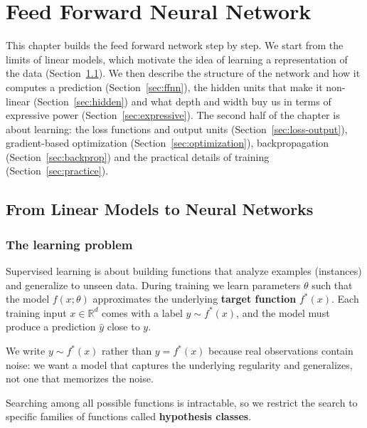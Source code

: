 \chapter{Feed Forward Neural Network}

This chapter builds the feed forward network step by step. We start from the
limits of linear models, which motivate the idea of learning a representation of
the data (Section~\ref{sec:linear-to-nn}). We then describe the structure of the
network and how it computes a prediction (Section~\ref{sec:ffnn}), the hidden
units that make it non-linear (Section~\ref{sec:hidden}) and what depth and width
buy us in terms of expressive power (Section~\ref{sec:expressive}). The second
half of the chapter is about learning: the loss functions and output units
(Section~\ref{sec:loss-output}), gradient-based optimization
(Section~\ref{sec:optimization}), backpropagation (Section~\ref{sec:backprop}) and
the practical details of training (Section~\ref{sec:practice}).

\section{From Linear Models to Neural Networks}
\label{sec:linear-to-nn}
\subsection{The learning problem}
Supervised learning is about building functions that analyze examples (instances)
and generalize to unseen data. During training we learn parameters $\theta$ such
that the model $f(x; \theta)$ approximates the underlying \textbf{target function}
$f^*(x)$. Each training input $x \in \mathbb{R}^d$ comes with a label
$y \sim f^*(x)$, and the model must produce a prediction $\hat{y}$ close to $y$.
\begin{note}
    We write $y \sim f^*(x)$ rather than $y = f^*(x)$ because real observations
    contain noise: we want a model that captures the underlying regularity and
    generalizes, not one that memorizes the noise.
\end{note}
Searching among all possible functions is intractable, so we restrict the search
to specific families of functions called \textbf{hypothesis classes}.

